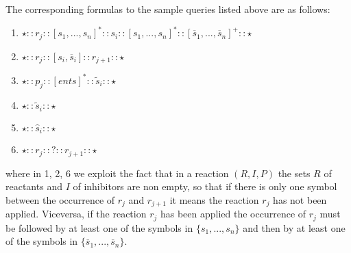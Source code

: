 
The corresponding formulas to the sample queries listed above are as follows:\\

\begin{enumerate}
\item
$\star :: r_j :: [ s_1,...,s_n ]^* :: s_i :: [  s_1,...,s_n ]^* :: [  \overline{s}_1,...,\overline{s}_n ]^+ :: \star$
\item
$\star :: r_j :: [s_i, \overline{s}_i] :: r_{j+1} :: \star$
\item
$\star :: p_j :: [  \mathit{ents} ]^* :: \tilde{s}_i :: \star$
\item
$\star :: \tilde{s}_i :: \star$
\item
$\star :: \hat{s}_i :: \star$
\item
$\star :: r_j :: ? :: r_{j+1} :: \star$
\end{enumerate}
where in 1, 2, 6 we exploit the fact that in a reaction $(R,I,P)$ the sets $R$ of reactants and  $I$ of inhibitors are non empty, so that if there is only one symbol between the occurrence of $r_j$ and $r_{j+1}$ it means the reaction $r_j$ has not been applied. Viceversa, if the reaction $r_j$ has been applied the occurrence of $r_j$ must be followed by at least one of the symbols in $\{s_1,...,s_n\}$ and then by at least one of the symbols in $\{\overline{s}_1,...,\overline{s}_n\}$.

